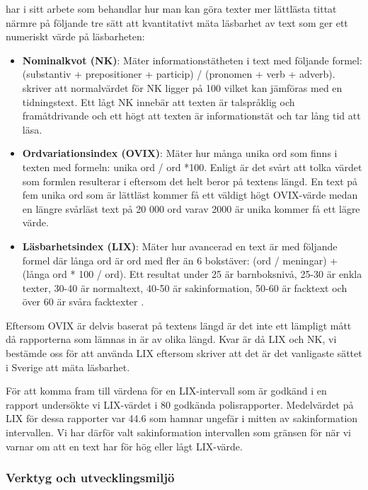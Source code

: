 \documentclass[swedish]{maucsthesis}
\begin{document}
\cite{abrahamsson:2011} har i sitt arbete som behandlar hur man kan göra texter
mer lättlästa tittat närmre på följande tre sätt att kvantitativt mäta läsbarhet
av text som ger ett numeriskt värde på läsbarheten:

\begin{itemize}
\item \textbf{Nominalkvot (NK)}: Mäter informationstätheten i text med följande
  formel: (substantiv + prepositioner + particip) / (pronomen + verb + adverb).
  \cite{abrahamsson:2011} skriver att normalvärdet för NK ligger på 100 vilket
  kan jämföras med en tidningstext. Ett lågt NK innebär att texten är
  talspråklig och framåtdrivande och ett högt att texten är informationstät och
  tar lång tid att läsa.
\item \textbf{Ordvariationsindex (OVIX)}: Mäter hur många unika ord som finns i
  texten med formeln: unika ord / ord *100. Enligt \cite{abrahamsson:2011} är
  det svårt att tolka värdet som formlen resulterar i eftersom det helt beror på
  textens längd. En text på fem unika ord som är lättläst kommer få ett väldigt
  högt OVIX-värde medan en längre svårläst text på 20 000 ord varav 2000 är
  unika kommer få ett lägre värde.
\item \textbf{Läsbarhetsindex (LIX)}: Mäter hur avancerad en text är med
  följande formel där långa ord är ord med fler än 6 bokstäver: (ord / meningar)
  + (långa ord * 100 / ord). Ett resultat under 25 är barnboksnivå, 25-30 är
  enkla texter, 30-40 är normaltext, 40-50 är sakinformation, 50-60 är facktext
  och över 60 är svåra facktexter \citep{abrahamsson:2011}.
\end{itemize}

Eftersom OVIX är delvis baserat på textens längd är det inte ett lämpligt mått då
rapporterna som lämnas in är av olika längd. Kvar är då LIX och NK, vi bestämde
oss för att använda LIX eftersom \cite{abrahamsson:2011} skriver att det är det
vanligaste sättet i Sverige att mäta läsbarhet.

För att komma fram till värdena för en LIX-intervall som är godkänd i en rapport
undersökte vi LIX-värdet i 80 godkända polisrapporter. Medelvärdet på LIX för
dessa rapporter var 44.6 som hamnar ungefär i mitten av sakinformation
intervallen. Vi har därför valt sakinformation intervallen som gränsen för när
vi varnar om att en text har för hög eller lågt LIX-värde.

\subsubsection{Verktyg och utvecklingsmiljö}
\end{document}
